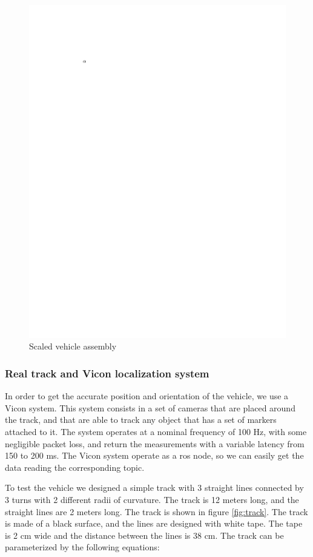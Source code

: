 \documentclass[a4paper,12pt,sort&compress]{article}
\begin{document}
    \begin{figure}
        \centering
        \includegraphics[width=0.6\linewidth]{a.pdf}
        \caption{Scaled vehicle assembly}
        \label{fig:vehicle_assembly}
    \end{figure}
    
\subsubsection*{Real track and Vicon localization system}
    In order to get the accurate position and orientation of the vehicle, we use a Vicon system.
    This system consists in a set of cameras that are placed around the track, and that are able to
    track any object that has a set of markers attached to it. The system operates at a nominal
    frequency of 100 Hz, with some negligible packet loss, and return the measurements with a variable
    latency from 150 to 200 ms. The Vicon system operate as a ros node, so we can easily get the
    data reading the corresponding topic. 
    
    To test the vehicle we designed a simple track with 3 straight lines connected by 3 turns with 2
    different radii of curvature. The track is 12 meters long, and the straight lines are 2 meters
    long. The track is shown in figure \ref{fig:track}. The track is made of a black surface, and
    the lines are designed with white tape. The tape is 2 cm wide and the distance between the lines
    is 38 cm. The track can be parameterized by the following equations:
    
\end{document}
